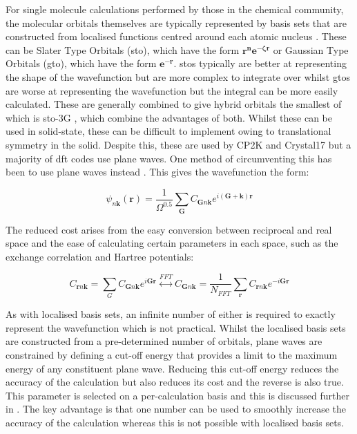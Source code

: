 For single molecule calculations performed by those in the chemical community, the molecular orbitals themselves are typically represented by basis sets that are constructed from localised functions centred around each atomic nucleus \cite{Huzinaga1985}. These can be Slater Type Orbitals (\acrshort{sto}), which have the form \(\boldsymbol{r^ne^{-\zeta r}}\) or Gaussian Type Orbitals (\acrshort{gto}), which have the form \(\boldsymbol{e^{-r}}\). \acrshort{sto}s typically are better at representing the shape of the wavefunction but are more complex to integrate over whilst \acrshort{gto}s are worse at representing the wavefunction but the integral can be more easily calculated. These are generally combined to give hybrid orbitals the smallest of which is \acrshort{sto}\nobreakdash-3G \cite{Halgren1978}, which combine the advantages of both. Whilst these can be used in solid\nobreakdash-state, these can be difficult to implement owing to translational symmetry in the solid. Despite this, these are used by CP2K \cite{Khne2020} and Crystal17 \cite{dovesi2020crystal} but a majority of \acrshort{dft} codes use plane waves. One method of circumventing this has been to use plane waves instead \cite{Hohenberg1964}. This gives the wavefunction the form: 

\begin{equation}
\psi_{n\mathbf{k}}(\mathbf{r}) = \frac{1}{\Omega^{0.5}} \sum_{\boldsymbol{G}} C_{\boldsymbol{G}n\mathbf{k}}e^{i(\boldsymbol{G}+\mathbf{k})\mathbf{r}}
\end{equation}

The reduced cost arises from the easy conversion between reciprocal and real space and the ease of calculating certain parameters in each space, such as the exchange correlation and Hartree potentials:

\begin{equation}
C_{\mathbf{r}n\mathbf{k}} = \sum_G C_{\boldsymbol{G}n\mathbf{k}} e^{i\boldsymbol{G}\mathbf{r}} \overset{FFT}{\leftrightarrow} C_{\mathbf{G}n\mathbf{k}} = \frac{1}{N_{FFT}} \sum_{\mathbf{r}} C_{\boldsymbol{r}n\mathbf{k}} e^{-i\boldsymbol{G}\mathbf{r}}
\end{equation}

As with localised basis sets, an infinite number of either is required to exactly represent the wavefunction which is not practical. Whilst the localised basis sets are constructed from a pre\nobreakdash-determined number of orbitals, plane waves are constrained by defining a cut\nobreakdash-off energy that provides a limit to the maximum energy of any constituent plane wave. Reducing this cut\nobreakdash-off energy reduces the accuracy of the calculation but also reduces its cost and the reverse is also true. This parameter is selected on a per\nobreakdash-calculation basis and this is discussed further in . The key advantage is that one number can be used to smoothly increase the accuracy of the calculation whereas this is not possible with localised basis sets.

